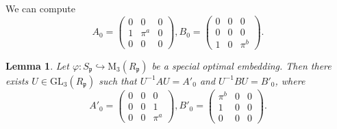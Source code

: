 \documentclass[12pt]{article}
\theoremstyle{plain}
\newtheorem{lemma}[theorem]{Lemma}
\theoremstyle{definition}
\theoremstyle{remark}
\begin{document}
We can compute 
$$
A_0=\begin{pmatrix}
0 & 0 & 0 \\
1 & \pi^a & 0 \\
0 & 0 & 0
\end{pmatrix},
B_0=\begin{pmatrix}
0 & 0 & 0 \\
0 & 0 & 0 \\
1 & 0 & \pi^b
\end{pmatrix}.
$$

 
\begin{lemma}\label{ssplit}
Let $\varphi : S_\mathfrak{p} \hookrightarrow \mathrm{M}_3(R_\mathfrak{p})$ be a special optimal embedding. Then there exists $U\in \mathrm{GL}_3(R_\mathfrak{p})$ such that $U^{-1}AU = A'_0$ and $U^{-1}BU = B'_0$, where 
$$A'_0=\begin{pmatrix}
0 & 0 & 0 \\
0 & 0 & 1 \\
0 & 0 & \pi^a
\end{pmatrix},
B'_0=\begin{pmatrix}
\pi^b & 0 & 0 \\
1 & 0 & 0 \\
0 & 0 & 0
\end{pmatrix}.$$
\end{lemma}
\end{document}
